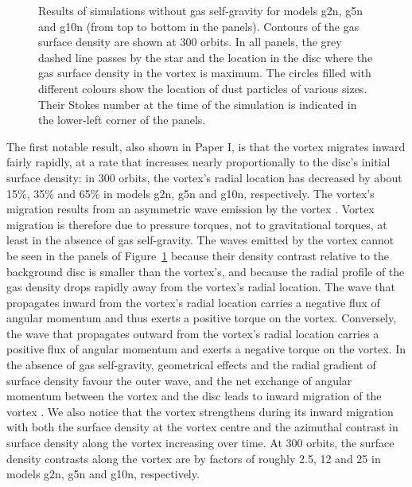 \documentclass[a4paper,usenatbib]{mnras}
\begin{document}
\begin{figure}
\caption{\label{fig:g1n}Results of simulations without gas
  self-gravity for models g2n, g5n and g10n (from top to bottom in the
  panels). Contours of the gas surface density are shown at 300
  orbits. In all panels, the grey dashed line passes by the star and
  the location in the disc where the gas surface density in the vortex
  is maximum. The circles filled with different colours show the
  location of dust particles of various sizes. Their Stokes number at
  the time of the simulation is indicated in the lower-left corner of
  the panels.}
\end{figure}

The first notable result, also shown in Paper I, is that the vortex
migrates inward fairly rapidly, at a rate that increases nearly
proportionally to the disc's initial surface density: in 300 orbits,
the vortex's radial location has decreased by about 15\%, 35\% and
65\% in models g2n, g5n and g10n, respectively. The vortex's migration
results from an asymmetric wave emission by the vortex \citep{PLP10}. 
Vortex migration is therefore due to pressure
  torques, not to gravitational torques, at least in the absence of
  gas self-gravity. The waves emitted by the vortex cannot be seen in
the panels of Figure~\ref{fig:g1n} because their density contrast
relative to the background disc is smaller than the vortex's, and
because the radial profile of the gas density drops rapidly away from
the vortex's radial location. The wave that propagates inward from the
vortex's radial location carries a negative flux of angular momentum
and thus exerts a positive torque on the vortex. Conversely, the wave
that propagates outward from the vortex's radial location carries a
positive flux of angular momentum and exerts a negative torque on the
vortex.  In the absence of gas self-gravity, geometrical effects and
the radial gradient of surface density favour the outer wave, and the
net exchange of angular momentum between the vortex and the disc leads
to inward migration of the vortex \citep{PLP10}. We also notice that
the vortex strengthens during its inward migration with both the
surface density at the vortex centre and the azimuthal contrast in
surface density along the vortex increasing over time. At 300 orbits,
the surface density contrasts along the vortex are by factors of
roughly 2.5, 12 and 25 in models g2n, g5n and g10n, respectively.
\end{document}
